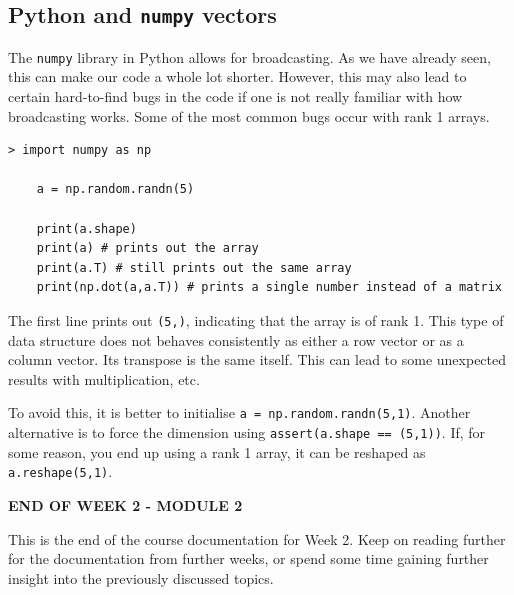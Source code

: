 \documentclass{article}[a4paper,12pt]
\theoremstyle{definition}
\begin{document}
\subsection{Python and \texttt{numpy} vectors}
The \texttt{numpy} library in Python allows for broadcasting. As we have already seen, this can make our code a whole lot shorter. However, this may also lead to certain hard-to-find bugs in the code if one is not really familiar with how broadcasting works. Some of the most common bugs occur with rank 1 arrays.
\begin{Verbatim}[tabsize=2]
> import numpy as np
	
	a = np.random.randn(5)
	
	print(a.shape)
	print(a) # prints out the array
	print(a.T) # still prints out the same array
	print(np.dot(a,a.T)) # prints a single number instead of a matrix
\end{Verbatim}
The first line prints out \texttt{(5,)}, indicating that the array is of rank 1. This type of data structure does not behaves consistently as either a row vector or as a column vector. Its transpose is the same itself. This can lead to some unexpected results with multiplication, etc. 
\vspace{6pt}

To avoid this, it is better to initialise \texttt{a = np.random.randn(5,1)}. Another alternative is to force the dimension using \texttt{assert(a.shape == (5,1))}. If, for some reason, you end up using a rank 1 array, it can be reshaped as \texttt{a.reshape(5,1)}.

\hrulefill
\begin{center}\textbf{END OF WEEK 2 - MODULE 2}\end{center}
This is the end of the course documentation for Week 2. Keep on reading further for the documentation from further weeks, or spend some time gaining further insight into the previously discussed topics.

\hrulefill
\pagebreak
\end{document}
